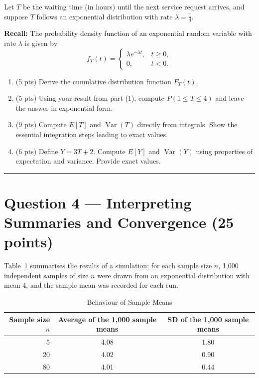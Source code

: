 \documentclass[11pt]{article}
\begin{document}
Let $T$ be the waiting time (in hours) until the next service request arrives, and suppose $T$ follows an exponential distribution with rate $\lambda = \tfrac{1}{4}$.

\medskip
\noindent\textbf{Recall:} The probability density function of an exponential random variable with rate $\lambda$ is given by
\[
f_T(t) =
\begin{cases}
\lambda e^{-\lambda t}, & t \ge 0,\\
0, & t < 0.
\end{cases}
\]

\begin{enumerate}
  \item (5 pts) Derive the cumulative distribution function $F_T(t)$.
  \item (5 pts) Using your result from part (1), compute $P(1 \le T \le 4)$ and leave the answer in exponential form.
  \item (9 pts) Compute $E[T]$ and $\operatorname{Var}(T)$ directly from integrals. Show the essential integration steps leading to exact values.
  \item (6 pts) Define $Y = 3T + 2$. Compute $E[Y]$ and $\operatorname{Var}(Y)$ using properties of expectation and variance. Provide exact values.
\end{enumerate}

\vspace{0.75em}
\hrule
\vspace{0.75em}

\section*{Question 4 — Interpreting Summaries and Convergence (25 points)}

Table~\ref{tab:a-sim} summarises the results of a simulation: for each sample size $n$, 1{,}000 independent samples of size $n$ were drawn from an exponential distribution with mean $4$, and the sample mean was recorded for each run.

\begin{table}[h]
\centering
\caption{Behaviour of Sample Means}\label{tab:a-sim}
\begin{tabular}{@{}rcc@{}}
\toprule
\textbf{Sample size $n$} & \textbf{Average of the 1,000 sample means} & \textbf{SD of the 1,000 sample means}\\
\midrule
5  & 4.08 & 1.80 \\
20 & 4.02 & 0.90 \\
80 & 4.01 & 0.44 \\
\bottomrule
\end{tabular}
\end{table}
\end{document}

